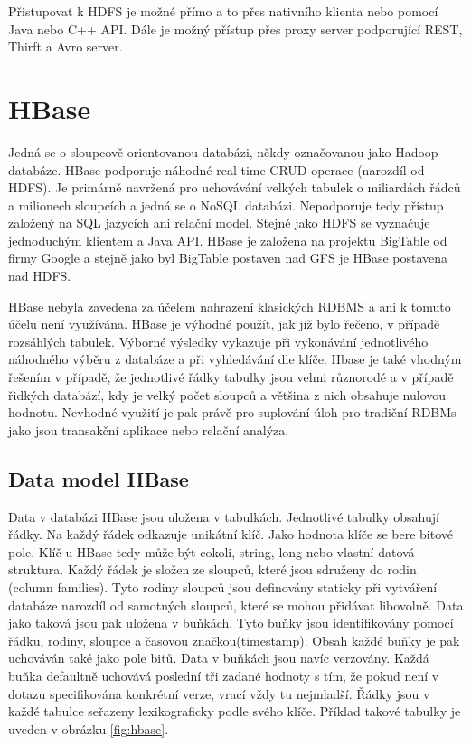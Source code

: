 \documentclass[thesis=M,czech]{FITthesis}[2012/06/26]
\begin{document}
Přistupovat k HDFS je možné přímo a to přes nativního klienta nebo pomocí Java nebo C++ API. Dále je možný přístup přes proxy server podporující REST, Thirft a Avro server.

\section{HBase}
Jedná se o sloupcově orientovanou databázi, někdy označovanou jako Hadoop databáze. HBase podporuje náhodné real-time CRUD operace (narozdíl od HDFS). Je primárně navržená pro uchovávání velkých tabulek o miliardách řádců a milionech sloupcích a jedná se o NoSQL databázi. Nepodporuje tedy přístup založený na SQL jazycích ani relační model. Stejně jako HDFS se vyznačuje jednoduchým klientem a Java API. HBase je založena na projektu BigTable od firmy Google\cite{BigTable} a stejně jako byl BigTable postaven nad GFS je HBase postavena nad HDFS.\cite{HbaseDG}

HBase nebyla zavedena za účelem nahrazení klasických RDBMS a ani k tomuto účelu není využívána. HBase je výhodné použít, jak již bylo řečeno, v případě rozsáhlých tabulek. Výborné výsledky vykazuje při vykonávání jednotlivého náhodného výběru z databáze a při vyhledávání dle klíče. Hbase je také vhodným řešením v případě, že jednotlivé řádky tabulky jsou velmi různorodé a v případě řidkých databází, kdy je velký počet sloupců a většina z nich obsahuje nulovou hodnotu. Nevhodné využití je pak právě pro suplování úloh pro tradiční RDBMs jako jsou transakční aplikace nebo relační analýza.\cite{HBaseWEB}

\subsection{Data model HBase}


Data v databázi HBase jsou uložena v tabulkách. Jednotlivé tabulky obsahují řádky. Na každý řádek odkazuje unikátní klíč. Jako hodnota klíče se bere bitové pole. Klíč u HBase tedy může být cokoli, string, long nebo vlastní datová struktura. Každý řádek je složen ze sloupců, které jsou sdruženy do rodin (column families). Tyto rodiny sloupců jsou definovány staticky při vytváření databáze narozdíl od samotných sloupců, které se mohou přidávat libovolně. Data jako taková jsou pak uložena v buňkách. Tyto buňky jsou identifikovány pomocí řádku, rodiny, sloupce a časovou značkou(timestamp). Obsah každé buňky je pak uchováván také jako pole bitů. Data v buňkách jsou navíc verzovány. Každá buňka defaultně uchovává poslední tři zadané hodnoty s tím, že pokud není v dotazu specifikována konkrétní verze, vrací vždy tu nejmladší. Řádky jsou v každé tabulce seřazeny lexikograficky podle svého klíče. Příklad takové tabulky je uveden v obrázku \ref{fig:hbase}.
\end{document}

